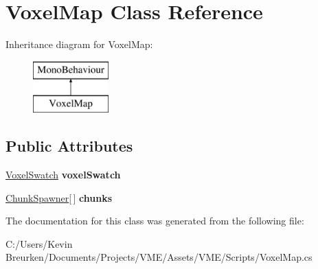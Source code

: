 \hypertarget{class_voxel_map}{}\section{Voxel\+Map Class Reference}
\label{class_voxel_map}
Inheritance diagram for Voxel\+Map\+:\begin{figure}[H]
\begin{center}
\leavevmode
\includegraphics[height=2.000000cm]{class_voxel_map}
\end{center}
\end{figure}
\subsection*{Public Attributes}
\begin{DoxyCompactItemize}
\item 
\hyperlink{class_voxel_swatch}{Voxel\+Swatch} {\bfseries voxel\+Swatch}\hypertarget{class_voxel_map_a982b16765614119d196c7279bc8d35d6}{}\label{class_voxel_map_a982b16765614119d196c7279bc8d35d6}

\item 
\hyperlink{class_chunk_spawner}{Chunk\+Spawner}\mbox{[}$\,$\mbox{]} {\bfseries chunks}\hypertarget{class_voxel_map_a78645e12f52fb1fa2415b059165ca3f6}{}\label{class_voxel_map_a78645e12f52fb1fa2415b059165ca3f6}

\end{DoxyCompactItemize}


The documentation for this class was generated from the following file\+:\begin{DoxyCompactItemize}
\item 
C\+:/\+Users/\+Kevin Breurken/\+Documents/\+Projects/\+V\+M\+E/\+Assets/\+V\+M\+E/\+Scripts/Voxel\+Map.\+cs\end{DoxyCompactItemize}

